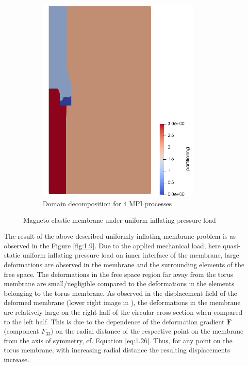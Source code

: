 \documentclass[11pt,a4paper,final]{article}
\begin{document}
\begin{figure}[h]
\begin{subfigure}[b]{0.39\textwidth}
\includegraphics[width=0.9\textwidth]{torus_grid_domain_decomp.png}
\caption{\scriptsize{Domain decomposition for 4 MPI processes}}
\label{fig:1.7.2}
\end{subfigure}
\caption{Magneto-elastic membrane under uniform inflating pressure load}
\label{fig:1.7}
\end{figure} 

The result of the above described uniformly inflating membrane problem is as observed in the Figure \eqref{fig:1.9}. Due to the applied mechanical load, here quasi-static uniform inflating pressure load on inner interface of the membrane, large deformations are observed in the membrane and the surrounding elements of the free space. The deformations in the free space region far away from the torus membrane are small/negligible compared to the deformations in the elements belonging to the torus membrane. As observed in the displacement field of the deformed membrane (lower right image in ), the deformations in the membrane are relatively large on the right half of the circular cross section when compared to the left half. This is due to the dependence of the deformation gradient $\mathbf{F}$ (component $F_{33}$) on the radial distance of the respective point on the membrane from the axis of symmetry, cf. Equation \eqref{eq:1.26}. Thus, for any point on the torus membrane, with increasing radial distance the resulting displacements increase. \par  
\end{document}
